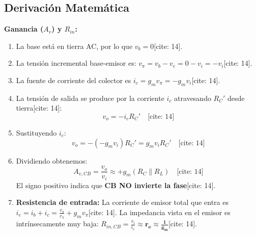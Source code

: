 \documentclass[11pt, a4paper]{article}
\begin{document}
\subsection{Derivación Matemática}
\textbf{Ganancia ($A_v$) y $R_{in}$:}
\begin{enumerate}
    \item La base está en tierra AC, por lo que $v_b = 0$[cite: 14].
    \item La tensión incremental base-emisor es: $v_\pi = v_b - v_e = 0 - v_i = -v_i$[cite: 14].
    \item La fuente de corriente del colector es $i_c = g_m v_\pi = -g_m v_i$[cite: 14].
    \item La tensión de salida se produce por la corriente $i_c$ atravesando $R_C'$ desde tierra[cite: 14]:
    $$ v_o = -i_c R_C' \quad \text{[cite: 14]} $$
    \item Sustituyendo $i_c$: 
    $$ v_o = -(-g_m v_i) R_C' = g_m v_i R_C' \quad \text{[cite: 14]} $$
    \item Dividiendo obtenemos:
    $$ \boxed{A_{v,CB} = \frac{v_o}{v_i} \approx +g_m (R_C \parallel R_L)} \quad \text{[cite: 14]} $$
    El signo positivo indica que \textbf{CB NO invierte la fase}[cite: 14].
    \item \textbf{Resistencia de entrada:} La corriente de emisor total que entra es $i_e = i_b + i_c = \frac{v_\pi}{r_\pi} + g_m v_\pi$[cite: 14]. La impedancia vista en el emisor es intrínsecamente muy baja: $R_{in,CB} = \frac{v_i}{i_e} \approx \mathbf{r_e \approx \frac{1}{g_m}}$[cite: 14].
\end{enumerate}

\newpage
\end{document}

